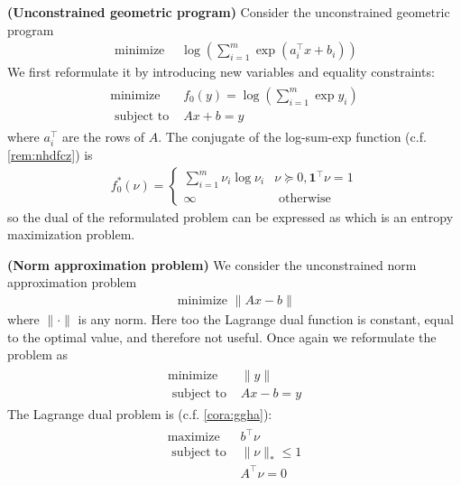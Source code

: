 \documentclass{article}
\newcommand{\bfs}[1]{\textbf{({#1}) }}
\begin{document}
\begin{exma}\bfs{Unconstrained geometric program}
Consider the unconstrained geometric program
\begin{align*}
\operatorname{minimize} \quad \log \left(\sum_{i=1}^{m} \exp \left(a_{i}^{\top} x+b_{i}\right)\right)
\end{align*}
We first reformulate it by introducing new variables and equality constraints:
\begin{align*}
\begin{array}{ll}
\operatorname{minimize} & f_{0}(y)=\log \left(\sum_{i=1}^{m} \exp y_{i}\right) \\
\text { subject to } & A x+b=y
\end{array}
\end{align*}
where $a_{i}^{\top}$ are the rows of $A$. The conjugate of the log-sum-exp function (c.f. \cref{rem:nhdfcz}) is
\begin{align*}
f_{0}^{*}(\nu)= \begin{cases}\sum_{i=1}^{m} \nu_{i} \log \nu_{i} & \nu \succeq 0, \mathbf{1}^{\top} \nu=1 \\ \infty & \text { otherwise }\end{cases}
\end{align*}
so the dual of the reformulated problem can be expressed as
which is an entropy maximization problem.
\end{exma} 
\begin{exma}\bfs{Norm approximation problem}\label{eq:ccvgdhg}
 We consider the unconstrained norm approximation problem
\begin{align*}
\text { minimize }\|A x-b\|
\end{align*}
where $\|\cdot\|$ is any norm. Here too the Lagrange dual function is constant, equal to the optimal value, and therefore not useful.
Once again we reformulate the problem as
\begin{align*}
\begin{array}{ll}
\operatorname{minimize} & \|y\| \\
\text { subject to } & A x-b=y
\end{array}
\end{align*}
The Lagrange dual problem is (c.f. \cref{cora:ggha}):
\begin{align*}
\begin{array}{ll}
\operatorname{maximize} & b^{\top} \nu \\
\text { subject to } & \|\nu\|_{*} \leq 1 \\
& A^{\top} \nu=0
\end{array}
\end{align*}
\end{exma} 
\end{document}
